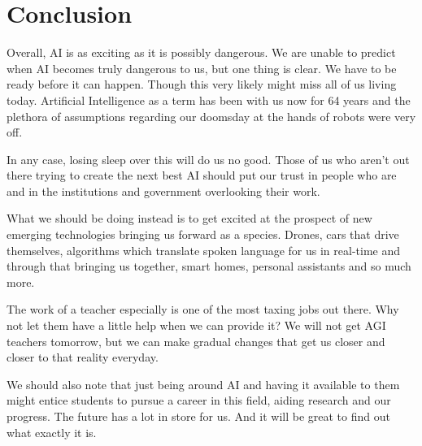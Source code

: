 \documentclass[10pt,a4paper,]{article}
\begin{document}
\section{Conclusion} \label{end}

Overall, AI is as exciting as it is possibly dangerous. We are unable to predict when AI becomes truly dangerous to us, but one thing is clear. We have to be ready before it can happen. Though this very likely might miss all of us living today. Artificial Intelligence as a term has been with us now for 64 years and the plethora of assumptions regarding our doomsday at the hands of robots were very off.

In any case, losing sleep over this will do us no good. Those of us who aren't out there trying to create the next best AI should put our trust in people who are and in the institutions and government overlooking their work.

What we should be doing instead is to get excited at the prospect of new emerging technologies bringing us forward as a species. Drones, cars that drive themselves, algorithms which translate spoken language for us in real-time and through that bringing us together, smart homes, personal assistants and so much more.

The work of a teacher especially is one of the most taxing jobs out there. Why not let them have a little help when we can provide it? We will not get AGI teachers tomorrow, but we can make gradual changes that get us closer and closer to that reality everyday.

We should also note that just being around AI and having it available to them might entice students to pursue a career in this field, aiding research and our progress. The future has a lot in store for us. And it will be great to find out what exactly it is.



\end{document}
